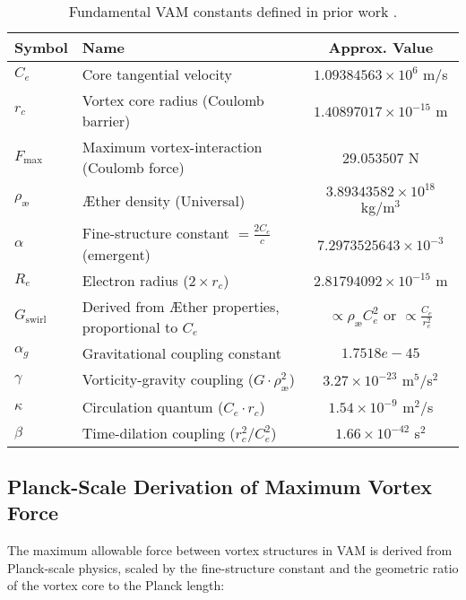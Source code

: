 \begin{table}[htbp]
    \centering
    \begin{tabular}{llc}
        \hline
        \textbf{Symbol} & \textbf{Name} & \textbf{Approx. Value} \\
        \hline
        $C_e$ & Core tangential velocity & $1.09384563 \times 10^6$ m/s \\
        $r_c$ & Vortex core radius (Coulomb barrier) & $1.40897017 \times 10^{-15}$ m \\
        $F_{\max}$ & Maximum vortex-interaction (Coulomb force) & $29.053507$ N \\
        $\rho_{\text{\ae}}$ & Æther density (Universal) & $3.89343582 \times 10^{18}$ kg/m$^3$ \\
        $\alpha$ & Fine-structure constant $= \frac{2 C_e}{c}$ (emergent)   & $7.2973525643 \times 10^{-3}$\\
        $R_e$ & Electron radius ($2 \times r_c$) & $2.81794092 \times 10^{-15}$ m \\
        $G_{\text{swirl}}$ & Derived from Æther properties, proportional to $C_e$ & $ \propto \rho_{\text{\ae}} C_e^2$ or $ \propto \frac{C_e}{r_c^2}$  \\
        $\alpha_g$ &   Gravitational coupling constant & $1.7518e-45$ \\
        $\gamma$  & Vorticity-gravity coupling ($G \cdot \rho_{\text{\ae}}^2$) & $3.27 \times 10^{-23}$  m$^5$/s$^2$\\
        $\kappa$  & Circulation quantum  ($C_e \cdot r_c$) & $1.54 \times 10^{-9}$  m$^2$/s     \\
        $\beta$  & Time-dilation coupling  ($r_c^2 / C_e^2$) & $1.66 \times 10^{-42}$  s$^2$      \\
        \hline
    \end{tabular}
    \caption{Fundamental VAM constants defined in prior work \cite{vam2025field, vam2025unified}.}\label{tab:table}
\end{table}



\subsection*{Planck-Scale Derivation of Maximum Vortex Force}

The maximum allowable force between vortex structures in VAM is derived from Planck-scale physics, scaled by the fine-structure constant and the geometric ratio of the vortex core to the Planck length:


